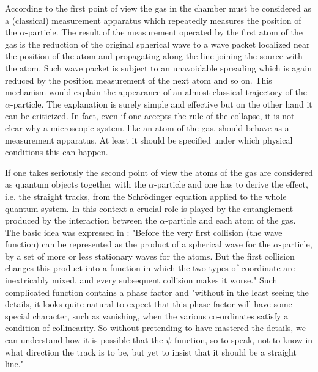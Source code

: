 \documentclass[12pt,reqno]{amsart}
\newcommand{\n}{\relax}
\numberwithin{equation}{section}
\begin{document}
\n
According to the first point of view the gas in the chamber must be considered as a (classical) measurement apparatus which repeatedly  measures the position of the $\alpha$-particle. The result of the   measurement operated by the first atom of the gas is the reduction of the original spherical wave to a wave packet localized near the position of the atom and propagating along the line joining the source with the atom. Such wave packet is subject to an unavoidable spreading which is again  reduced by the position measurement of the next atom and so on. This mechanism would explain the appearance of an almost classical trajectory of the $\alpha$-particle. The explanation is surely simple and effective  but on the other hand it can be criticized. In fact, even if one accepts the rule of the collapse, it is not clear why a microscopic system, like an atom of the gas, should behave as a measurement apparatus. At least it should be  specified under which physical conditions this can happen.

\n
If one takes seriously  the second point of view the atoms of the gas are considered as quantum objects together with the $\alpha$-particle and one has to derive   the effect, i.e. the straight tracks, from the Schr\"{o}dinger equation applied to the whole quantum system. In this context a crucial role is played by the entanglement produced by the interaction between the $\alpha$-particle and each atom of the gas. The basic idea was  expressed in \cite{d}: "Before the very first collision (the wave function) can be represented as the product of a spherical wave for the $\alpha$-particle, by a set of more or less stationary waves for the atoms. But the first collision changes this product into a function in which the two types of coordinate are inextricably mixed, and every subsequent collision makes it worse."  Such complicated function contains a phase factor and "without in the least seeing the details, it looks quite natural to expect that this phase factor will have some special character, such as vanishing, when the various co-ordinates  satisfy a condition of collinearity. So without pretending to have mastered the details, we can understand how it is possible that the $\psi$ function, so to speak, not to know in what direction  the track is to be, but yet to insist that it should be a straight line."
\end{document}
